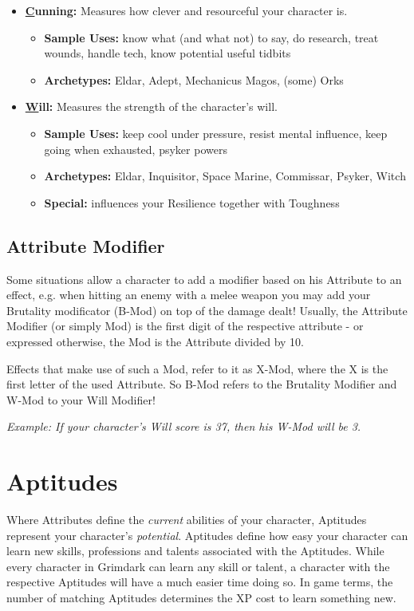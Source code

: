 \begin{itemize}
		\item {\large\textbf{\underline{C}unning:}} Measures how clever and resourceful your character is.
		\begin{itemize}
			\item \textbf{Sample Uses:} know what (and what not) to say, do research, treat wounds, handle tech, know potential useful tidbits
			\item \textbf{Archetypes:} Eldar, Adept, Mechanicus Magos, (some) Orks
		\end{itemize}

		\item {\large\textbf{\underline{W}ill:}} Measures the strength of the character's will.
		\begin{itemize}
			\item \textbf{Sample Uses:} keep cool under pressure, resist mental influence, keep going when exhausted, psyker powers
			\item \textbf{Archetypes:} Eldar, Inquisitor, Space Marine, Commissar, Psyker, Witch
			\item \textbf{Special:} influences your Resilience together with Toughness
		\end{itemize}
	\end{itemize}


	\subsection{Attribute Modifier}
		Some situations allow a character to add a modifier based on his Attribute to an effect, e.g. when hitting an enemy with a melee weapon you may add your Brutality modificator (B-Mod) on top of the damage dealt!
		Usually, the Attribute Modifier (or simply Mod) is the first digit of the respective attribute - or expressed otherwise, the Mod is the Attribute divided by 10. 

		Effects that make use of such a Mod, refer to it as X-Mod, where the X is the first letter of the used Attribute.
		So B-Mod refers to the Brutality Modifier and W-Mod to your Will Modifier!

		\textit{Example: If your character's Will score is 37, then his W-Mod will be 3.}

\section{Aptitudes}\label{Aptitudes}
	Where Attributes define the \textit{current} abilities of your character, Aptitudes represent your character's \textit{potential}.
	Aptitudes define how easy your character can learn new skills, professions and talents associated with the Aptitudes.
	While every character in Grimdark can learn any skill or talent, a character with the respective Aptitudes will have a much easier time doing so.
	In game terms, the number of matching Aptitudes determines the XP cost to learn something new.

